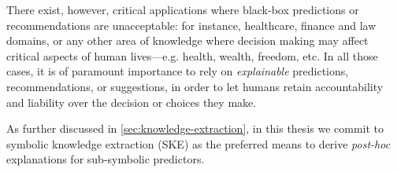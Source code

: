 \documentclass[12pt,a4paper,openright,twoside]{book}
\begin{document}
There exist, however, critical applications where black-box predictions or recommendations are unacceptable: for instance,  healthcare, finance and law domains, or any other area of knowledge where decision making may affect critical aspects of human lives---e.g. health, wealth, freedom, etc.
%
In all those cases, it is of paramount importance to rely on \emph{explainable} predictions, recommendations, or suggestions, in order to let humans retain accountability and liability over the decision or choices they make.

%
%
%
%
As further discussed in \cref{sec:knowledge-extraction}, in this thesis we commit to symbolic knowledge extraction (SKE) as the preferred means to derive \emph{post-hoc} explanations for sub-symbolic predictors.
\end{document}
